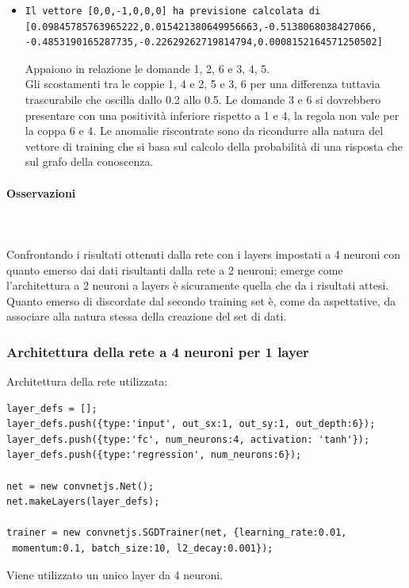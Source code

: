 \begin{itemize}
\item \begin{verbatim}Il vettore [0,0,-1,0,0,0] ha previsione calcolata di
[0.09845785763965222,0.015421380649956663,-0.5138068038427066,
-0.4853190165287735,-0.22629262719814794,0.0008152164571250502]
\end{verbatim}
Appaiono in relazione le domande 1, 2, 6 e 3, 4, 5.\\
Gli scostamenti tra le coppie 1, 4 e 2, 5 e 3, 6 per una differenza tuttavia trascurabile  che oscilla dallo 0.2 allo 0.5.
Le domande 3 e 6 si dovrebbero presentare con una positivit\`a inferiore rispetto a 1 e 4, la regola non vale per la coppa 6 e 4.
Le anomalie riscontrate sono da ricondurre alla natura del vettore di training che si basa sul calcolo della probabilit\`a di una risposta che sul grafo della conoscenza.
\end{itemize}


\paragraph{Osservazioni}\mbox{}
\label{Osservazioni su rete a 2 neuroni per ciascuno dei 2 layers}
\\\\
\noindent
Confrontando i risultati ottenuti dalla rete con i layers impostati a 4 neuroni con quanto emerso dai dati risultanti dalla  rete a 2 neuroni; emerge come l'architettura  a 2 neuroni a layers \`e sicuramente quella che da i risultati attesi.\\
Quanto emerso di discordate dal secondo training set \`e, come da aspettative, da associare alla natura stessa della creazione del set di dati.


\subsubsection{Architettura della rete a 4 neuroni per 1 layer}
\label{Architettura della rete a 4 neuroni per 1 layer}

Architettura della rete utilizzata:\\
\begin{verbatim}layer_defs = [];
layer_defs.push({type:'input', out_sx:1, out_sy:1, out_depth:6});
layer_defs.push({type:'fc', num_neurons:4, activation: 'tanh'});
layer_defs.push({type:'regression', num_neurons:6});

net = new convnetjs.Net();
net.makeLayers(layer_defs);

trainer = new convnetjs.SGDTrainer(net, {learning_rate:0.01,
 momentum:0.1, batch_size:10, l2_decay:0.001});
\end{verbatim}
\noindent
Viene utilizzato un unico layer da 4 neuroni.


